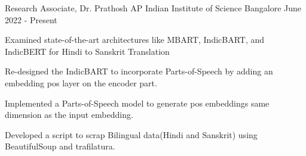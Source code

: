 

\begin{cventries}


  \cventry
    {Research Associate, Dr. Prathosh AP} %
    {Indian Institute of Science} %
    {Bangalore} %
    {June 2022 - Present} %
    {
      \begin{cvitems} %
        \item {Examined state-of-the-art architectures like MBART, IndicBART, and IndicBERT for Hindi to Sanskrit Translation}
        \item {Re-designed the IndicBART to incorporate Parts-of-Speech by adding an embedding pos layer on the encoder part.}
        \item {Implemented a Parts-of-Speech model to generate pos embeddings same dimension as the input embedding.}
        \item {Developed a script to scrap Bilingual data(Hindi and Sanskrit) using BeautifulSoup and trafilatura.}
      \end{cvitems}
    }


\end{cventries}

